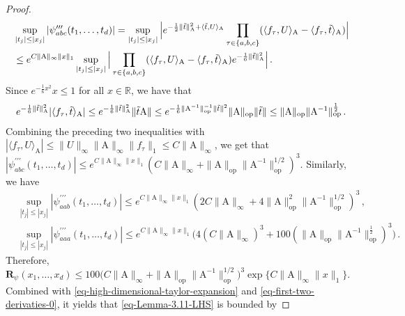 \documentclass[11pt]{article}
\numberwithin{equation}{section}
\begin{document}
\begin{proof}
\begin{align*}
    & \sup_{|t_j| \leq |x_j|} |\psi^{\prime \prime \prime}_{abc}(t_1,\ldots,t_d)| = \sup_{|t_j| \leq |x_j|} \Big| e^{-\frac{1}{2} \| \Tilde{t} \|_{\mathrm{A}}^2 + \langle \Tilde{t}, U \rangle_{\mathrm{A}} } \prod_{ \tau \in \{a,b,c \} } ( \langle f_{\tau}, U \rangle_{\mathrm{A}} - \langle f_{\tau}, \Tilde{t} \rangle_{\mathrm{A}} )  \Big| \\
    & \leq e^{ C \| \mathrm{A} \|_{\infty} \| x \|_1 }  \sup_{|t_j| \leq |x_j|} \Big| \prod_{ \tau \in \{a,b,c \} } ( \langle f_{\tau}, U \rangle_{\mathrm{A}} - \langle f_{\tau}, \Tilde{t} \rangle_{\mathrm{A}} ) e^{-\frac{1}{6} \| \Tilde{t} \|_{\mathrm{A}}^2  } \Big| \,.
\end{align*}
Since $e^{- \frac{1}{6} x^2} x\leq 1$ for all $x\in \mathbb R$, we have that 
\begin{align*}
    e^{-\frac{1}{6} \| \Tilde{t} \|_{\mathrm{A}}^2  } | \langle f_{\tau}, \Tilde{t} \rangle_{\mathrm{A}} | \leq e^{-\frac{1}{6} \| \Tilde{t} \|_{\mathrm{A}}^2 } \| \Tilde{t} \mathrm{A} \| \leq e^{ -\frac{1}{6} \| \mathrm{A}^{-1} \|_{\mathrm{op}}^{-1} \| \Tilde{t} \|^2 } \| \mathrm{A} \|_{\mathrm{op}} \| \Tilde{t} \| \leq \| \mathrm{A} \|_{\mathrm{op}} \| \mathrm{A}^{-1} \|_{\mathrm{op}}^{\frac{1}{2}} \,.
\end{align*}
Combining the preceding two inequalities with $| \langle f_{\tau},U \rangle_{\mathrm{A}} | \leq \| U \|_{\infty} \| \mathrm{A} \|_{\infty} \| f_{\tau} \|_1 \leq C\| \mathrm{A} \|_{\infty}$,
we get that $|\psi^{\prime \prime \prime}_{abc} (t_1,\ldots,t_d)| \leq e^{C \| \mathrm{A} \|_{\infty} \| x \|_1} ( C\| \mathrm{A} \|_{\infty} + \| \mathrm{A} \|_{\mathrm{op}} \| \mathrm{A}^{-1} \|_{\mathrm{op}}^{1/2} )^3$. Similarly, we have
\begin{align*}
    & \sup_{|t_j| \leq |x_j|} |\psi^{\prime \prime \prime}_{aab}(t_1,\ldots,t_d)|  \leq e^{ C \| \mathrm{A} \|_{\infty} \| x \|_{1} } ( 2 C \| \mathrm{A} \|_{\infty} + 4 \| \mathrm{A} \|_{\mathrm{op}}^2 \| \mathrm{A}^{-1} \|_{\mathrm{op}}^{1/2} )^3 \,, \\
    & \sup_{|t_j| \leq |x_j|} |\psi^{\prime \prime \prime}_{aaa}(t_1,\ldots,t_d)| 
    \leq e^{ C \| \mathrm{A} \|_{\infty} \| x \|_{1} } \big( 4(C \| \mathrm{A} \|_{\infty})^3 + 100 (\| \mathrm{A} \|_{\mathrm{op}} \| \mathrm{A}^{-1} \|_{\mathrm{op}}^{\frac{1}{2}} )^3 \big) \,.
\end{align*}
Therefore, $\mathbf{R}_{\psi} (x_1,\ldots,x_d) \leq 100 \big( C \| \mathrm{A} \|_{\infty} + \| \mathrm{A} \|_{\mathrm{op}} \| \mathrm{A}^{-1} \|_{\mathrm{op}}^{1/2} \big)^3 \exp \{ C \| \mathrm{A} \|_{\infty} \| x \|_1 \}$. Combined with \eqref{eq-high-dimensional-taylor-expansion} and \eqref{eq-first-two-derivaties-0}, it yields that \eqref{eq-Lemma-3.11-LHS} is bounded by

\end{proof}
\end{document}
